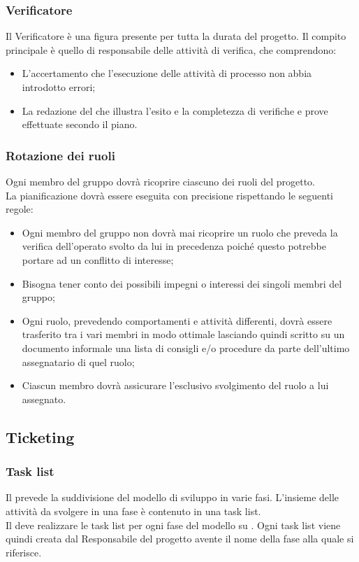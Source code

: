 \documentclass[NormeDiProgetto.tex]{subfiles}
\begin{document}
	\subsubsection{Verificatore}
	Il Verificatore è una figura presente per tutta la durata del progetto. Il compito principale è quello di responsabile delle attività di verifica, che comprendono:
	\begin{itemize}
	\item L'accertamento che l'esecuzione delle attività di processo non abbia introdotto errori;
	\item La redazione del \pdq{} che illustra l'esito e la completezza di verifiche e prove effettuate secondo il piano.
	\end{itemize}
	
	\subsubsection{Rotazione dei ruoli}
	Ogni membro del gruppo dovrà ricoprire ciascuno dei ruoli del progetto.\\
	La pianificazione dovrà essere eseguita con precisione rispettando le seguenti regole:
	\begin{itemize}
		\item Ogni membro del gruppo non dovrà mai ricoprire un ruolo che preveda la verifica dell'operato svolto da lui in precedenza poiché questo potrebbe	portare ad un conflitto di interesse;
		\item Bisogna tener conto dei possibili impegni o interessi dei singoli membri del gruppo;
		\item Ogni ruolo, prevedendo comportamenti e attività differenti, dovrà essere trasferito tra i vari membri in modo ottimale lasciando quindi scritto su un documento informale una lista di consigli e/o procedure da parte dell'ultimo assegnatario di quel ruolo;
		\item Ciascun membro dovrà assicurare l'esclusivo svolgimento del ruolo a lui assegnato.
	\end{itemize}
	
	
	\subsection{Ticketing}
	\subsubsection{Task list}
	Il \pdp{} prevede la suddivisione del modello di sviluppo in varie fasi.
	L'insieme delle attività da svolgere in una fase è contenuto in una task list.\\
	Il \respdiprog{} deve realizzare le task list per ogni fase del modello su .
	Ogni task list viene quindi creata dal Responsabile del progetto avente il nome della fase alla quale si riferisce.
	
\end{document}

